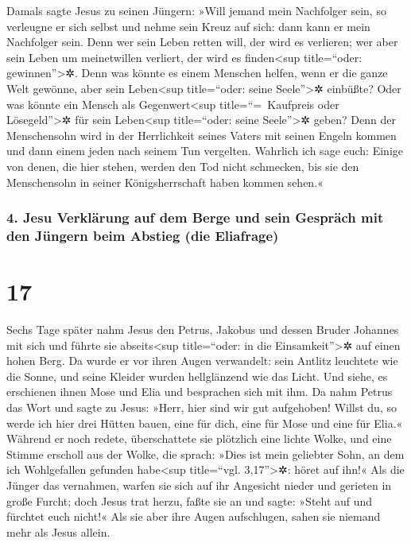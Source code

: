  Damals sagte Jesus zu seinen Jüngern: »Will jemand mein
Nachfolger sein, so verleugne er sich selbst und nehme sein Kreuz auf
sich: dann kann er mein Nachfolger sein.  Denn wer sein
Leben retten will, der wird es verlieren; wer aber sein Leben um
meinetwillen verliert, der wird es finden\textless sup title=``oder:
gewinnen''\textgreater✲.  Denn was könnte es einem
Menschen helfen, wenn er die ganze Welt gewönne, aber sein
Leben\textless sup title=``oder: seine Seele''\textgreater✲ einbüßte?
Oder was könnte ein Mensch als Gegenwert\textless sup
title=``=~Kaufpreis oder Lösegeld''\textgreater✲ für sein
Leben\textless sup title=``oder: seine Seele''\textgreater✲ geben?
 Denn der Menschensohn wird in der Herrlichkeit seines
Vaters mit seinen Engeln kommen und dann einem jeden nach seinem Tun
vergelten.  Wahrlich ich sage euch: Einige von denen, die
hier stehen, werden den Tod nicht schmecken, bis sie den Menschensohn in
seiner Königsherrschaft haben kommen sehen.«

\hypertarget{jesu-verkluxe4rung-auf-dem-berge-und-sein-gespruxe4ch-mit-den-juxfcngern-beim-abstieg-die-eliafrage}{%
\subsubsection{4. Jesu Verklärung auf dem Berge und sein Gespräch mit
den Jüngern beim Abstieg (die
Eliafrage)}\label{jesu-verkluxe4rung-auf-dem-berge-und-sein-gespruxe4ch-mit-den-juxfcngern-beim-abstieg-die-eliafrage}}

\hypertarget{section-16}{%
\section{17}\label{section-16}}

 Sechs Tage später nahm Jesus den Petrus, Jakobus und
dessen Bruder Johannes mit sich und führte sie abseits\textless sup
title=``oder: in die Einsamkeit''\textgreater✲ auf einen hohen Berg.
 Da wurde er vor ihren Augen verwandelt: sein Antlitz
leuchtete wie die Sonne, und seine Kleider wurden hellglänzend wie das
Licht.  Und siehe, es erschienen ihnen Mose und Elia und
besprachen sich mit ihm.  Da nahm Petrus das Wort und
sagte zu Jesus: »Herr, hier sind wir gut aufgehoben! Willst du, so werde
ich hier drei Hütten bauen, eine für dich, eine für Mose und eine für
Elia.«  Während er noch redete, überschattete sie
plötzlich eine lichte Wolke, und eine Stimme erscholl aus der Wolke, die
sprach: »Dies ist mein geliebter Sohn, an dem ich Wohlgefallen gefunden
habe\textless sup title=``vgl. 3,17''\textgreater✲: höret auf ihn!«
 Als die Jünger das vernahmen, warfen sie sich auf ihr
Angesicht nieder und gerieten in große Furcht;  doch Jesus
trat herzu, faßte sie an und sagte: »Steht auf und fürchtet euch nicht!«
 Als sie aber ihre Augen aufschlugen, sahen sie niemand
mehr als Jesus allein.

